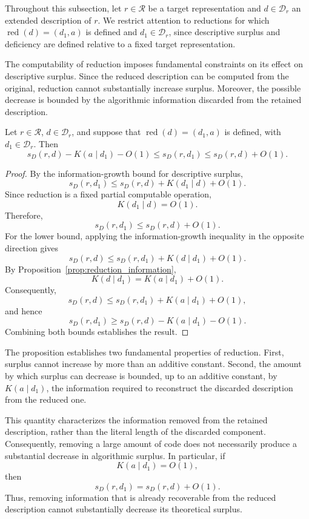 Throughout this subsection, let $r\in\mathcal R$ be a target representation and $d\in\mathcal D_r$ an extended description of $r$. We restrict attention to reductions for which $\operatorname{red}(d)=(d_1,a)$ is defined and $d_1\in\mathcal D_r$, since descriptive surplus and deficiency are defined relative to a fixed target representation.

The computability of reduction imposes fundamental constraints on its effect on descriptive surplus. Since the reduced description can be computed from the original, reduction cannot substantially increase surplus. Moreover, the possible decrease is bounded by the algorithmic information discarded from the retained description.

\begin{proposition}
\label{prop:surplus_reduction_description}
Let $r\in\mathcal R$, $d\in\mathcal D_r$, and suppose that $\operatorname{red}(d)=(d_1,a)$ is defined, with $d_1\in\mathcal D_r$. Then
\[
s_D(r,d)-K(a\mid d_1)-O(1) \leq s_D(r,d_1) \leq s_D(r,d)+O(1).
\]
\end{proposition}
\begin{proof}
By the information-growth bound for descriptive surplus,
\[
s_D(r,d_1) \leq s_D(r,d)+K(d_1\mid d)+O(1).
\]
Since reduction is a fixed partial computable operation,
\[
K(d_1\mid d)=O(1).
\]
Therefore,
\[
s_D(r,d_1)\leq s_D(r,d)+O(1).
\]
For the lower bound, applying the information-growth inequality in the opposite direction gives
\[
s_D(r,d) \leq s_D(r,d_1)+K(d\mid d_1)+O(1).
\]
By Proposition~\ref{prop:reduction_information},
\[
K(d\mid d_1)=K(a\mid d_1)+O(1).
\]
Consequently,
\[
s_D(r,d) \leq s_D(r,d_1)+K(a\mid d_1)+O(1),
\]
and hence
\[
s_D(r,d_1) \geq
s_D(r,d)-K(a\mid d_1)-O(1).
\]
Combining both bounds establishes the result.
\end{proof}

The proposition establishes two fundamental properties of reduction. First, surplus cannot increase by more than an additive constant. Second, the amount by which surplus can decrease is bounded, up to an additive
constant, by $K(a\mid d_1)$, the information required to reconstruct the discarded description from the reduced one.

This quantity characterizes the information removed from the retained description, rather than the literal length of the discarded component. Consequently, removing a large amount of code does not necessarily produce a substantial decrease in algorithmic surplus. In particular, if
\[
K(a\mid d_1)=O(1),
\]
then
\[
s_D(r,d_1)=s_D(r,d)+O(1).
\]
Thus, removing information that is already recoverable from the reduced description cannot substantially decrease its theoretical surplus.

